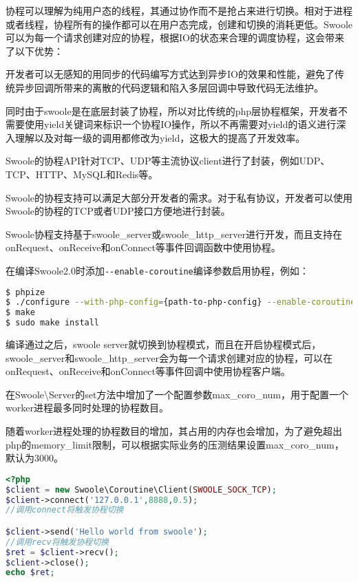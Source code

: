 协程可以理解为纯用户态的线程，其通过协作而不是抢占来进行切换。相对于进程或者线程，协程所有的操作都可以在用户态完成，创建和切换的消耗更低。Swoole可以为每一个请求创建对应的协程，根据IO的状态来合理的调度协程，这会带来了以下优势：

\begin{compactenum}
\item 开发者可以无感知的用同步的代码编写方式达到异步IO的效果和性能，避免了传统异步回调所带来的离散的代码逻辑和陷入多层回调中导致代码无法维护。

\item 同时由于swoole是在底层封装了协程，所以对比传统的php层协程框架，开发者不需要使用yield关键词来标识一个协程IO操作，所以不再需要对yield的语义进行深入理解以及对每一级的调用都修改为yield，这极大的提高了开发效率。

\end{compactenum}

Swoole的协程API针对TCP、UDP等主流协议client进行了封装，例如UDP、TCP、HTTP、MySQL和Redis等。


Swoole的协程支持可以满足大部分开发者的需求。对于私有协议，开发者可以使用Swoole的协程的TCP或者UDP接口方便地进行封装。


Swoole协程支持基于swoole\_server或swoole\_http\_server进行开发，而且支持在onRequest、onReceive和onConnect等事件回调函数中使用协程。

在编译Swoole2.0时添加\texttt{-\/-enable-coroutine}编译参数启用协程，例如：

\begin{lstlisting}[language=bash]
$ phpize
$ ./configure --with-php-config={path-to-php-config} --enable-coroutine
$ make
$ sudo make install
\end{lstlisting}

编译通过之后，swoole server就切换到协程模式，而且在开启协程模式后，swoole\_server和swoole\_http\_server会为每一个请求创建对应的协程，可以在onRequest、onReceive和onConnect等事件回调中使用协程客户端。

在Swoole\textbackslash Server的set方法中增加了一个配置参数max\_coro\_num，用于配置一个worker进程最多同时处理的协程数目。



随着worker进程处理的协程数目的增加，其占用的内存也会增加，为了避免超出php的memory\_limit限制，可以根据实际业务的压测结果设置max\_coro\_num，默认为3000。


\begin{lstlisting}[language=PHP]
<?php
$client = new Swoole\Coroutine\Client(SWOOLE_SOCK_TCP);
$client->connect('127.0.0.1',8888,0.5);
//调用connect将触发协程切换

$client->send('Hello world from swoole');
//调用recv将触发协程切换
$ret = $client->recv();
$client->close();
echo $ret;
\end{lstlisting}


